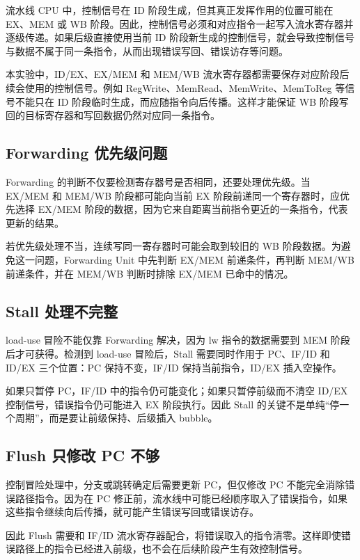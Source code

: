 \documentclass[UTF8,zihao=-4]{ctexart}
\begin{document}
流水线 CPU 中，控制信号在 ID 阶段生成，但其真正发挥作用的位置可能在 EX、MEM 或 WB 阶段。因此，控制信号必须和对应指令一起写入流水寄存器并逐级传递。如果后级直接使用当前 ID 阶段新生成的控制信号，就会导致控制信号与数据不属于同一条指令，从而出现错误写回、错误访存等问题。

本实验中，ID/EX、EX/MEM 和 MEM/WB 流水寄存器都需要保存对应阶段后续会使用的控制信号。例如 RegWrite、MemRead、MemWrite、MemToReg 等信号不能只在 ID 阶段临时生成，而应随指令向后传播。这样才能保证 WB 阶段写回的目标寄存器和写回数据仍然对应同一条指令。

\subsection{Forwarding 优先级问题}

Forwarding 的判断不仅要检测寄存器号是否相同，还要处理优先级。当 EX/MEM 和 MEM/WB 阶段都可能向当前 EX 阶段前递同一个寄存器时，应优先选择 EX/MEM 阶段的数据，因为它来自距离当前指令更近的一条指令，代表更新的结果。

若优先级处理不当，连续写同一寄存器时可能会取到较旧的 WB 阶段数据。为避免这一问题，Forwarding Unit 中先判断 EX/MEM 前递条件，再判断 MEM/WB 前递条件，并在 MEM/WB 判断时排除 EX/MEM 已命中的情况。

\subsection{Stall 处理不完整}

load-use 冒险不能仅靠 Forwarding 解决，因为 lw 指令的数据需要到 MEM 阶段后才可获得。检测到 load-use 冒险后，Stall 需要同时作用于 PC、IF/ID 和 ID/EX 三个位置：PC 保持不变，IF/ID 保持当前指令，ID/EX 插入空操作。

如果只暂停 PC，IF/ID 中的指令仍可能变化；如果只暂停前级而不清空 ID/EX 控制信号，错误指令仍可能进入 EX 阶段执行。因此 Stall 的关键不是单纯“停一个周期”，而是要让前级保持、后级插入 bubble。

\subsection{Flush 只修改 PC 不够}

控制冒险处理中，分支或跳转确定后需要更新 PC，但仅修改 PC 不能完全消除错误路径指令。因为在 PC 修正前，流水线中可能已经顺序取入了错误指令，如果这些指令继续向后传播，就可能产生错误写回或错误访存。

因此 Flush 需要和 IF/ID 流水寄存器配合，将错误取入的指令清零。这样即使错误路径上的指令已经进入前级，也不会在后续阶段产生有效控制信号。
\end{document}

